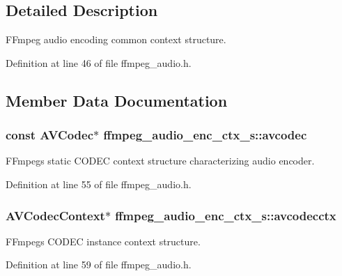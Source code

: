 \subsection{Detailed Description}
F\+Fmpeg audio encoding common context structure. 

Definition at line 46 of file ffmpeg\+\_\+audio.\+h.



\subsection{Member Data Documentation}
\subsubsection[{\texorpdfstring{avcodec}{avcodec}}]{\setlength{\rightskip}{0pt plus 5cm}const A\+V\+Codec$\ast$ ffmpeg\+\_\+audio\+\_\+enc\+\_\+ctx\+\_\+s\+::avcodec}\hypertarget{structffmpeg__audio__enc__ctx__s_ad61caf9672db18679002c9b8dc5c5f3f}{}\label{structffmpeg__audio__enc__ctx__s_ad61caf9672db18679002c9b8dc5c5f3f}
F\+Fmpeg\textquotesingle{}s static C\+O\+D\+EC context structure characterizing audio encoder. 

Definition at line 55 of file ffmpeg\+\_\+audio.\+h.

\subsubsection[{\texorpdfstring{avcodecctx}{avcodecctx}}]{\setlength{\rightskip}{0pt plus 5cm}A\+V\+Codec\+Context$\ast$ ffmpeg\+\_\+audio\+\_\+enc\+\_\+ctx\+\_\+s\+::avcodecctx}\hypertarget{structffmpeg__audio__enc__ctx__s_a6e28c577d3b609bebfcccb091aa25555}{}\label{structffmpeg__audio__enc__ctx__s_a6e28c577d3b609bebfcccb091aa25555}
F\+Fmpeg\textquotesingle{}s C\+O\+D\+EC instance context structure. 

Definition at line 59 of file ffmpeg\+\_\+audio.\+h.

